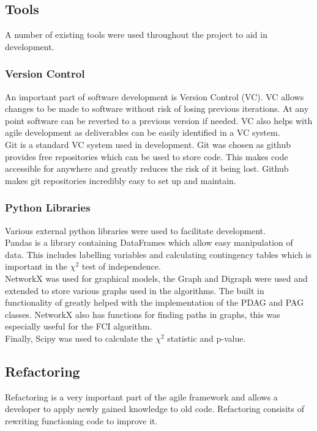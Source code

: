 \documentclass{article}
\begin{document}
\subsection{Tools}
A number of existing tools were used throughout the project to aid in development. 

\subsubsection{Version Control}
An important part of software development is Version Control (VC). VC allows changes to be made to software without risk of losing previous iterations. At any point software can be reverted to a previous version if needed. VC also helps with agile development as deliverables can be easily identified in a VC system.\\

Git is a standard VC system used in development. Git was chosen as github provides free repositories which can be used to store code. This makes code accessible for anywhere and greatly reduces the risk of it being lost. Github makes git repositories incredibly easy to set up and maintain.\\

\subsubsection{Python Libraries}
Various external python libraries were used to facilitate development.\\

Pandas is a library containing DataFrames which allow easy manipulation of data. This includes labelling variables and calculating contingency tables which is important in the $\chi^2$ test of independence.\\

NetworkX was used for graphical models, the Graph and Digraph were used and extended to store various graphs used in the algorithms. The built in functionality of greatly helped with the implementation of the PDAG and PAG classes. NetworkX also has functions for finding paths in graphs, this was especially useful for the FCI algorithm.\\

Finally, Scipy was used to calculate the $\chi^2$ statistic and p-value. \\

\subsection{Refactoring}
Refactoring is a very important part of the agile framework and allows a developer to apply newly gained knowledge to old code. Refactoring consisits of rewriting functioning code to improve it.\\
\end{document}
